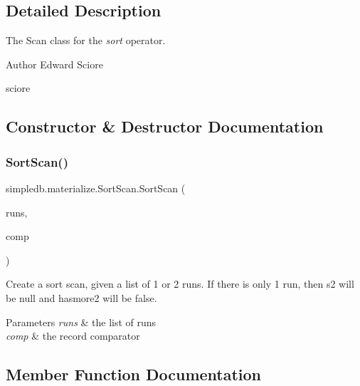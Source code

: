 \subsection{Detailed Description}
The Scan class for the {\itshape sort} operator. \begin{DoxyAuthor}{Author}
Edward Sciore 

sciore 
\end{DoxyAuthor}


\subsection{Constructor \& Destructor Documentation}
\mbox{\label{classsimpledb_1_1materialize_1_1SortScan_aff8ec9b6958bc0af2b668e33e1a23f3d}} 
\subsubsection{\texorpdfstring{Sort\+Scan()}{SortScan()}}
{\footnotesize\ttfamily simpledb.\+materialize.\+Sort\+Scan.\+Sort\+Scan (\begin{DoxyParamCaption}\item[{List$<$ \hyperlink{classsimpledb_1_1materialize_1_1TempTable}{Temp\+Table} $>$}]{runs,  }\item[{\hyperlink{classsimpledb_1_1materialize_1_1RecordComparator}{Record\+Comparator}}]{comp }\end{DoxyParamCaption})\hspace{0.3cm}{\ttfamily [inline]}}

Create a sort scan, given a list of 1 or 2 runs. If there is only 1 run, then s2 will be null and hasmore2 will be false. 
\begin{DoxyParams}{Parameters}
{\em runs} & the list of runs \\
\hline
{\em comp} & the record comparator \\
\hline
\end{DoxyParams}


\subsection{Member Function Documentation}
\mbox{\label{classsimpledb_1_1materialize_1_1SortScan_aa9fed9077d78dcbd50a0c1504e5b5c86}} 
